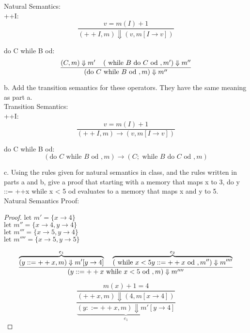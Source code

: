 \begin{enumerate}
Natural Semantics: \\

++I:
\[
	\frac
	{
		v = m(I) + 1
	}
	{
		(++I, m) \Downarrow (v, m[ I \rightarrow v ] )
	}
\]

do C while B od:
\[
	\frac
	{
		(C, m) \Downarrow m' \hspace*{4mm} (\text{ while } B \text{ do } C \text{ od }, m') \Downarrow m''
	}
	{
		(\text{do } C \text{ while } B \text{ od }, m) \Downarrow m''
	}
\]

b.  Add the transition semantics for these operators. They have the same meaning as part a. \\

Transition Semantics: \\

++I:
\[
	\frac
	{
		v = m(I) + 1
	}
	{
		(++I, m) \rightarrow (v, m[ I \rightarrow v ] )
	}
\]

do C while B od:
\[
	(\text{do } C \text{ while } B \text{ od }, m ) \rightarrow (C; \text{ while } B \text{ do } C \text{ od }, m )
\]

c. Using the rules given for natural semantics in class, and the rules written in parts a and b, give a proof that starting with a memory that maps x to 3, do y ::= ++x while x < 5 od evaluates to a memory that maps x and y to 5. \\

Natural Semantics Proof: \\

\begin{proof}

\( \text{let } m' = \{ x \rightarrow 4 \}	 \) \\
\( \text{let } m'' = \{ x \rightarrow 4, y \rightarrow 4 \}	 \) \\
\( \text{let } m''' = \{ x \rightarrow 5, y \rightarrow 4 \}	 \) \\
\( \text{let } m'''' = \{ x \rightarrow 5, y \rightarrow 5 \}	 \)

\[
	\frac
	{
		\overbrace{
			(y ::= ++x, m) \Downarrow m'[y \rightarrow 4]
		}^{e_1}
		\hspace*{4mm}
		\overbrace{
			(\while x < 5 \do y ::= ++x  \od, m'') \Downarrow m''''
		}^{e_2}
	}
	{
		(\do y ::= ++x \while x < 5 \od, m) \Downarrow m''''
	}
\]

\[
	\frac
	{	
		\dfrac
		{
			m(x) + 1 = 4
		}
		{
			(++x, m) \Downarrow (4, m[x \rightarrow 4])
		}
	}
	{
		\underbrace{
			(y ::= ++x, m) \Downarrow m'[y \rightarrow 4]
		}_{e_1}
	}
\]


\end{proof}
\end{enumerate}
